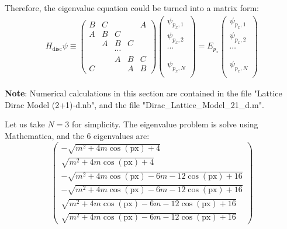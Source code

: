 \documentclass{article}
\begin{document}
Therefore, the eigenvalue equation could be turned into a matrix form:
\begin{align}
    \label{eq:disc-eigeneq}
    H_{\text{disc}} \psi \equiv 
    \begin{pmatrix}
        B   & C &        &   & A \\
        A   & B & C      &   & \\
            & A & B      & C & \\
            &   & \cdots &   & \\
            &   & A      & B & C \\
        C   &   &        & A & B
    \end{pmatrix}
    \begin{pmatrix}
        \psi_{p_x,1} \\
        \psi_{p_x,2} \\
        \cdots \\
        \\
        \\
        \psi_{p_x,N} \\
    \end{pmatrix} =
    E_{p_x}
    \begin{pmatrix}
        \psi_{p_x,1} \\
        \psi_{p_x,2} \\
        \cdots \\
        \\
        \\
        \psi_{p_x,N} \\
    \end{pmatrix}
\end{align}

\textbf{Note}: Numerical calculations in this section are contained in the file
"Lattice Dirac Model (2+1)-d.nb", and the file
"Dirac\_Lattice\_Model\_21\_d.m".

Let us take $N=3$ for simplicity. The eigenvalue problem is solve
using Mathematica, and the $6$ eigenvalues are:
\begin{equation}
    \begin{pmatrix}
    -\sqrt{m^2+4 m \cos (\text{px})+4}\\
    \sqrt{m^2+4 m \cos (\text{px})+4}\\
    -\sqrt{m^2+4 m \cos (\text{px})-6 m-12 \cos (\text{px})+16}\\
    -\sqrt{m^2+4 m \cos (\text{px})-6 m-12 \cos (\text{px})+16}\\
    \sqrt{m^2+4 m \cos (\text{px})-6 m-12 \cos (\text{px})+16}\\
    \sqrt{m^2+4 m \cos (\text{px})-6 m-12 \cos (\text{px})+16}
    \end{pmatrix}
\end{equation}
\end{document}
